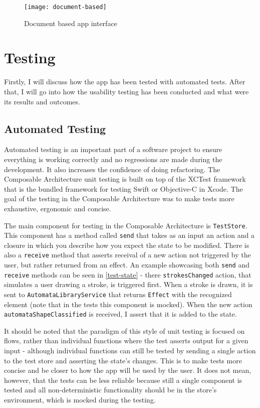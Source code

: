 \begin{figure}
    \texttt{[image: document-based]}
    \caption{Document based app interface}\label{document-based-interface}
\end{figure}

\chapter{Testing}
\label{chap:testing}

Firstly, I will discuss how the app has been tested with automated tests. After that, I will go into how the usability testing has been conducted and what were its results and outcomes.

\section{Automated Testing}

Automated testing is an important part of a software project to ensure everything is working correctly and no regressions are made during the development. It also increases the confidence of doing refactoring. The Composable Architecture unit testing is built on top of the XCTest framework that is the bundled framework for testing Swift or Objective-C in Xcode. The goal of the testing in the Composable Architecture was to make tests more exhaustive, ergonomic and concise.

The main component for testing in the Composable Architecture is \lstinline{TestStore}. This component has a method called \lstinline{send} that takes as an input an action and a closure in which you describe how you expect the state to be modified. There is also a \lstinline{receive} method that asserts receival of a new action not triggered by the user, but rather returned from an effect. An example showcasing both \lstinline{send} and \lstinline{receive} methods can be seen in \ref{test-state} - there \lstinline{strokesChanged} action, that simulates a user drawing a stroke, is triggered first. When a stroke is drawn, it is sent to \lstinline{AutomataLibraryService} that returns \lstinline{Effect} with the recognized element (note that in the tests this component is mocked). When the new action \lstinline{automataShapeClassified} is received, I assert that it is added to the state.

It should be noted that the paradigm of this style of unit testing is focused on flows, rather than individual functions where the test asserts output for a given input - although individual functions can still be tested by sending a single action to the test store and asserting the state's changes. This is to make tests more concise and be closer to how the app will be used by the user. It does not mean, however, that the tests can be less reliable because still a single component is tested and all non-deterministic functionality should be in the store's environment, which is mocked during the testing. 

